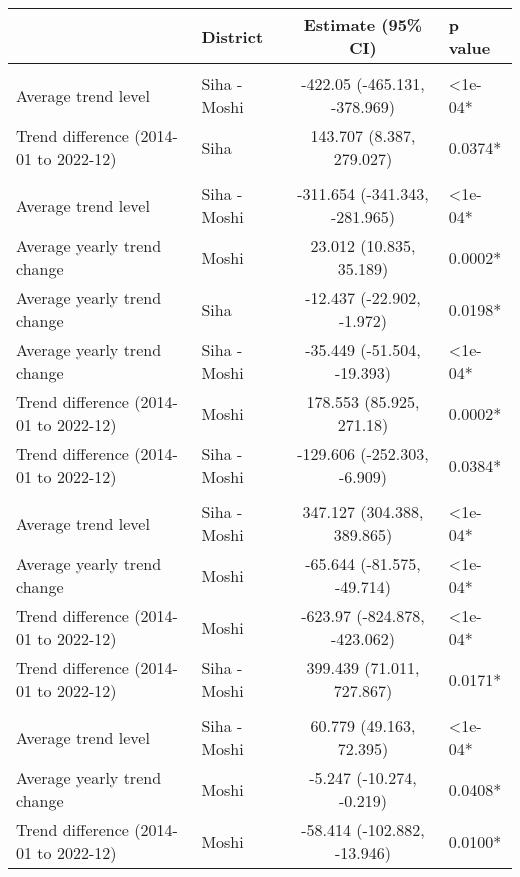 \begin{longtable}{l|lcl}
\toprule
\multicolumn{1}{l}{} & District & Estimate (95\% CI) & p value \\ 
\midrule\addlinespace[2.5pt]
\multicolumn{4}{l}{Cardiovascular Diseases} \\ 
\midrule\addlinespace[2.5pt]
Average trend level & Siha - Moshi & -422.05 (-465.131, -378.969) & <1e-04* \\ 
Trend difference (2014-01 to 2022-12) & Siha & 143.707 (8.387, 279.027) & 0.0374* \\ 
\midrule\addlinespace[2.5pt]
\multicolumn{4}{l}{Diabetes Mellitus} \\ 
\midrule\addlinespace[2.5pt]
Average trend level & Siha - Moshi & -311.654 (-341.343, -281.965) & <1e-04* \\ 
Average yearly trend change & Moshi & 23.012 (10.835, 35.189) & 0.0002* \\ 
Average yearly trend change & Siha & -12.437 (-22.902, -1.972) & 0.0198* \\ 
Average yearly trend change & Siha - Moshi & -35.449 (-51.504, -19.393) & <1e-04* \\ 
Trend difference (2014-01 to 2022-12) & Moshi & 178.553 (85.925, 271.18) & 0.0002* \\ 
Trend difference (2014-01 to 2022-12) & Siha - Moshi & -129.606 (-252.303, -6.909) & 0.0384* \\ 
\midrule\addlinespace[2.5pt]
\multicolumn{4}{l}{Gastrointestinal Infections} \\ 
\midrule\addlinespace[2.5pt]
Average trend level & Siha - Moshi & 347.127 (304.388, 389.865) & <1e-04* \\ 
Average yearly trend change & Moshi & -65.644 (-81.575, -49.714) & <1e-04* \\ 
Trend difference (2014-01 to 2022-12) & Moshi & -623.97 (-824.878, -423.062) & <1e-04* \\ 
Trend difference (2014-01 to 2022-12) & Siha - Moshi & 399.439 (71.011, 727.867) & 0.0171* \\ 
\midrule\addlinespace[2.5pt]
\multicolumn{4}{l}{Infectious Eye Disease} \\ 
\midrule\addlinespace[2.5pt]
Average trend level & Siha - Moshi & 60.779 (49.163, 72.395) & <1e-04* \\ 
Average yearly trend change & Moshi & -5.247 (-10.274, -0.219) & 0.0408* \\ 
Trend difference (2014-01 to 2022-12) & Moshi & -58.414 (-102.882, -13.946) & 0.0100* \\ 

\end{longtable}

